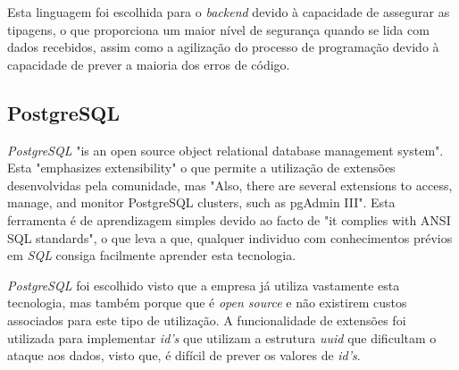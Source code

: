 Esta linguagem foi escolhida para o \textit{backend} devido à capacidade de assegurar as tipagens, o que proporciona um maior nível de segurança quando se lida com dados recebidos, assim como a agilização do processo de programação devido à capacidade de prever a maioria dos erros de código.

\subsection{PostgreSQL}
\emph{PostgreSQL} "is an open source object relational database management system"\citep{Juba2015}. Esta "emphasizes extensibility"\citep{Juba2015} o que permite a utilização de extensões desenvolvidas pela comunidade, mas "Also, there are several extensions to access, manage, and monitor PostgreSQL clusters, such as pgAdmin III"\citep{Juba2015}. Esta ferramenta é de aprendizagem simples devido ao facto de "it complies with ANSI SQL standards"\citep{Juba2015}, o que leva a que, qualquer individuo com conhecimentos prévios em \emph{SQL} consiga facilmente aprender esta tecnologia.

\emph{PostgreSQL} foi escolhido visto que a empresa já utiliza vastamente esta tecnologia, mas também porque que é \emph{open source} e não existirem custos associados para este tipo de utilização. A funcionalidade de extensões foi utilizada para implementar \emph{id's} que utilizam a estrutura \emph{uuid} que dificultam o ataque aos dados, visto que, é difícil de prever os valores de \emph{id's}.







\newpage



\newpage



